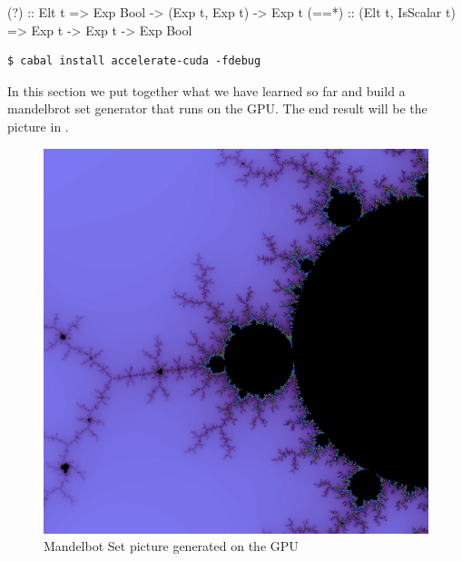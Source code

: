 
\ToDo{}



\ToDo{}

\begin{haskell}
(?) :: Elt t => Exp Bool -> (Exp t, Exp t) -> Exp t
(==*) :: (Elt t, IsScalar t) => Exp t -> Exp t -> Exp Bool
\end{haskell}



\begin{verbatim}
$ cabal install accelerate-cuda -fdebug
\end{verbatim}



In this section we put together what we have learned so far and build
a mandelbrot set generator that runs on the GPU.  The end result will
be the picture in .

\begin{figure}
\begin{center}
\includegraphics[scale=0.6]{mandel.png}
\end{center}
\label{fig:mandel}
\caption{Mandelbot Set picture generated on the GPU}
\end{figure}

